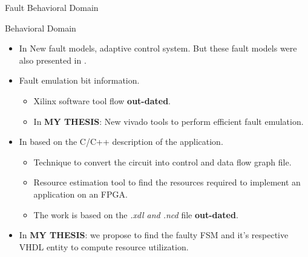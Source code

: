 \documentclass[aspectratio=1610]{beamer}
\begin{document}
\begin{frame}{Fault Behavioral Domain}

\begin{block}{Behavioral Domain}

\end{block}
\begin{itemize}

\item In \citep{hobeika2013flight} New fault models, adaptive control system. But these fault models were also presented in \citep{MOGENTES}.

\item Fault emulation bit information.
\begin{itemize}

\item Xilinx software tool flow \textbf{out-dated}.

\item In \textbf{MY THESIS}: New vivado tools to perform efficient fault emulation.
\end{itemize}


\item In \citep{thibeault2013library} based on the C/C++ description of the application.

\begin{itemize}


\item Technique to convert the circuit into control and data flow graph file.
\item Resource estimation tool to find the resources required to implement an application on an FPGA.
\item The work is based on the \textit{.xdl and .ncd} file \textbf{out-dated}. 
\end{itemize}

\item In \textbf{MY THESIS}: we propose to find the faulty FSM and it's respective VHDL entity to compute resource utilization.

\end{itemize}
 






\end{frame}
\end{document}
